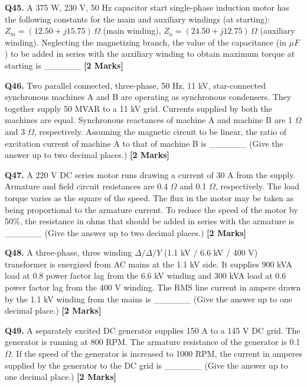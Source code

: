 \documentclass[11pt]{article}
\newcommand{\questionb}[2]{
    \noindent\textbf{Q#2.} #1 \hfill \textbf{[2 Marks]}
}
\begin{document}
\questionb{A 375 W, 230 V, 50 Hz capacitor start single-phase induction motor has the following constants for the main and auxiliary windings (at starting): \( Z_m = (12.50 + j15.75)\,\Omega \) (main winding), \( Z_a = (24.50 + j12.75)\,\Omega \) (auxiliary winding). Neglecting the magnetizing branch, the value of the capacitance (in \( \mu F \)) to be added in series with the auxiliary winding to obtain maximum torque at starting is \_\_\_\_\_\_}{45}
\vspace{0.5cm}

\questionb{Two parallel connected, three-phase, 50 Hz, 11 kV, star-connected synchronous machines A and B are operating as synchronous condensers. They together supply 50 MVAR to a 11 kV grid. Currents supplied by both the machines are equal. Synchronous reactances of machine A and machine B are 1 \( \Omega \) and 3 \( \Omega \), respectively. Assuming the magnetic circuit to be linear, the ratio of excitation current of machine A to that of machine B is \_\_\_\_\_\_ (Give the answer up to two decimal places.)}{46}
\vspace{0.5cm}

\questionb{A 220 V DC series motor runs drawing a current of 30 A from the supply. Armature and field circuit resistances are 0.4 \( \Omega \) and 0.1 \( \Omega \), respectively. The load torque varies as the square of the speed. The flux in the motor may be taken as being proportional to the armature current. To reduce the speed of the motor by 50\%, the resistance in ohms that should be added in series with the armature is \_\_\_\_\_\_ (Give the answer up to two decimal places.)}{47}
\vspace{0.5cm}

\questionb{A three-phase, three winding \( \Delta/\Delta/Y \) (1.1 kV / 6.6 kV / 400 V) transformer is energized from AC mains at the 1.1 kV side. It supplies 900 kVA load at 0.8 power factor lag from the 6.6 kV winding and 300 kVA load at 0.6 power factor lag from the 400 V winding. The RMS line current in ampere drawn by the 1.1 kV winding from the mains is \_\_\_\_\_\_ (Give the answer up to one decimal place.)}{48}
\vspace{0.5cm}

\questionb{A separately excited DC generator supplies 150 A to a 145 V DC grid. The generator is running at 800 RPM. The armature resistance of the generator is 0.1 \( \Omega \). If the speed of the generator is increased to 1000 RPM, the current in amperes supplied by the generator to the DC grid is \_\_\_\_\_\_ (Give the answer up to one decimal place.)}{49}
\vspace{0.5cm}
\end{document}
